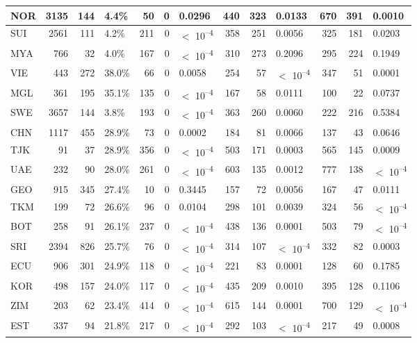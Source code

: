 \begin{tabular}{l|r|r|l|r|r|l|r|r|l|r|r|l}
\hline
NOR & 3135 & 144 & 4.4\% & 50 & 0 & 0.0296 & 440 & 323 & 0.0133 & 670 & 391 & 0.0010\\
\hline
SUI & 2561 & 111 & 4.2\% & 211 & 0 & $<$ 10\textsuperscript{--4} & 358 & 251 & 0.0056 & 325 & 181 & 0.0203\\
\hline
MYA & 766 & 32 & 4.0\% & 167 & 0 & $<$ 10\textsuperscript{--4} & 310 & 273 & 0.2096 & 295 & 224 & 0.1949\\
\hline
VIE & 443 & 272 & 38.0\% & 66 & 0 & 0.0058 & 254 & 57 & $<$ 10\textsuperscript{--4} & 347 & 51 & 0.0001\\
\hline
MGL & 361 & 195 & 35.1\% & 135 & 0 & $<$ 10\textsuperscript{--4} & 167 & 58 & 0.0111 & 100 & 22 & 0.0737\\
\hline
SWE & 3657 & 144 & 3.8\% & 193 & 0 & $<$ 10\textsuperscript{--4} & 363 & 260 & 0.0060 & 222 & 216 & 0.5384\\
\hline
CHN & 1117 & 455 & 28.9\% & 73 & 0 & 0.0002 & 184 & 81 & 0.0066 & 137 & 43 & 0.0646\\
\hline
TJK & 91 & 37 & 28.9\% & 356 & 0 & $<$ 10\textsuperscript{--4} & 503 & 171 & 0.0003 & 565 & 145 & 0.0009\\
\hline
UAE & 232 & 90 & 28.0\% & 261 & 0 & $<$ 10\textsuperscript{--4} & 603 & 135 & 0.0012 & 777 & 138 & $<$ 10\textsuperscript{--4}\\
\hline
GEO & 915 & 345 & 27.4\% & 10 & 0 & 0.3445 & 157 & 72 & 0.0056 & 167 & 47 & 0.0111\\
\hline
TKM & 199 & 72 & 26.6\% & 96 & 0 & 0.0104 & 298 & 101 & 0.0039 & 324 & 56 & $<$ 10\textsuperscript{--4}\\
\hline
BOT & 258 & 91 & 26.1\% & 237 & 0 & $<$ 10\textsuperscript{--4} & 438 & 136 & 0.0001 & 503 & 79 & $<$ 10\textsuperscript{--4}\\
\hline
SRI & 2394 & 826 & 25.7\% & 76 & 0 & $<$ 10\textsuperscript{--4} & 314 & 107 & $<$ 10\textsuperscript{--4} & 332 & 82 & 0.0003\\
\hline
ECU & 906 & 301 & 24.9\% & 118 & 0 & $<$ 10\textsuperscript{--4} & 221 & 83 & 0.0001 & 128 & 60 & 0.1785\\
\hline
KOR & 498 & 157 & 24.0\% & 117 & 0 & $<$ 10\textsuperscript{--4} & 435 & 209 & 0.0010 & 395 & 128 & 0.1106\\
\hline
ZIM & 203 & 62 & 23.4\% & 414 & 0 & $<$ 10\textsuperscript{--4} & 615 & 144 & 0.0001 & 700 & 129 & $<$ 10\textsuperscript{--4}\\
\hline
EST & 337 & 94 & 21.8\% & 217 & 0 & $<$ 10\textsuperscript{--4} & 292 & 103 & $<$ 10\textsuperscript{--4} & 217 & 49 & 0.0008\\

\end{tabular}
